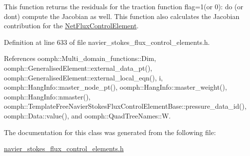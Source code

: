 This function returns the residuals for the traction function flag=1(or 0)\+: do (or don\textquotesingle{}t) compute the Jacobian as well. This function also calculates the Jacobian contribution for the \hyperlink{classoomph_1_1NetFluxControlElement}{Net\+Flux\+Control\+Element}. 



Definition at line 633 of file navier\+\_\+stokes\+\_\+flux\+\_\+control\+\_\+elements.\+h.



References oomph\+::\+Multi\+\_\+domain\+\_\+functions\+::\+Dim, oomph\+::\+Generalised\+Element\+::external\+\_\+data\+\_\+pt(), oomph\+::\+Generalised\+Element\+::external\+\_\+local\+\_\+eqn(), i, oomph\+::\+Hang\+Info\+::master\+\_\+node\+\_\+pt(), oomph\+::\+Hang\+Info\+::master\+\_\+weight(), oomph\+::\+Hang\+Info\+::nmaster(), oomph\+::\+Template\+Free\+Navier\+Stokes\+Flux\+Control\+Element\+Base\+::pressure\+\_\+data\+\_\+id(), oomph\+::\+Data\+::value(), and oomph\+::\+Quad\+Tree\+Names\+::W.



The documentation for this class was generated from the following file\+:\begin{DoxyCompactItemize}
\item 
\hyperlink{navier__stokes__flux__control__elements_8h}{navier\+\_\+stokes\+\_\+flux\+\_\+control\+\_\+elements.\+h}\end{DoxyCompactItemize}
